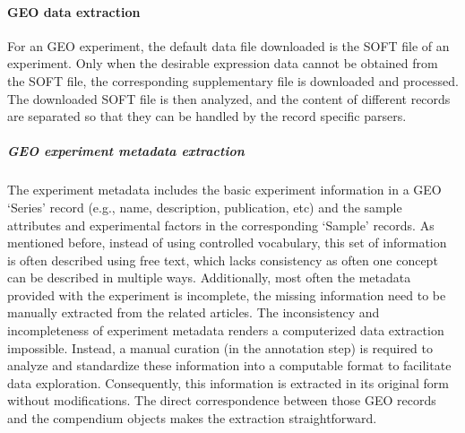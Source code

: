 








\paragraph{GEO data extraction}

For an GEO experiment, the default data file downloaded is the SOFT
file of an experiment.  Only when the desirable expression data cannot
be obtained from the SOFT file, the corresponding supplementary file
is downloaded and processed.  The downloaded SOFT file is then
analyzed, and the content of different records are separated so that
they can be handled by the record specific parsers.




\subparagraph{GEO experiment metadata extraction}
%
The experiment metadata includes the basic experiment information in a GEO 
`Series' record (e.g., name, description, publication, etc) and the sample 
attributes and experimental factors in the corresponding `Sample' records.
%
As mentioned before, instead of using controlled vocabulary, this set
of information is often described using free text, which lacks
consistency as often one concept can be described in multiple ways.
%
Additionally, most often the metadata provided with the experiment is
incomplete, the missing information need to be manually extracted from
the related articles.
%
The inconsistency and incompleteness of experiment metadata renders a
computerized data extraction impossible.  Instead, a manual curation
(in the annotation step) is required to analyze and standardize these
information into a computable format to facilitate data exploration.
%
Consequently, this information is extracted in its original form without
modifications.
%
The direct correspondence between those GEO records and the compendium
objects makes the extraction straightforward.

